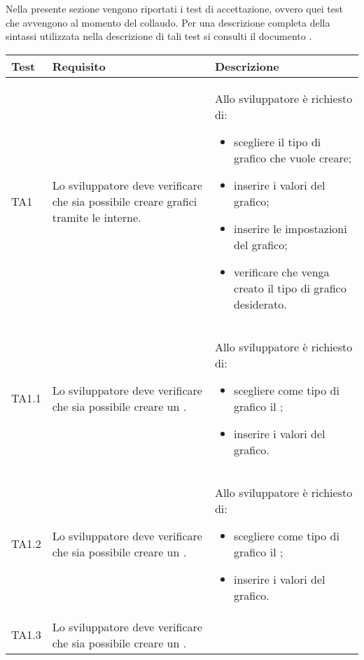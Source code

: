 	Nella presente sezione vengono riportati i test di accettazione, ovvero quei test che avvengono al momento del collaudo. Per una descrizione completa della sintassi utilizzata nella descrizione di tali test si consulti il documento .

	\begin{longtabu}{| X[0.5] | X | X |}

	\hline
	\rowfont{\bf}
	Test &
	Requisito &
	Descrizione \\
	\hline \endhead

	TA1 & Lo sviluppatore deve verificare che sia possibile creare grafici tramite le  interne.
	 
		& Allo sviluppatore è richiesto di:
		\begin{itemize}
			\item scegliere il tipo di grafico che vuole creare;
			\item inserire i valori del grafico;
			\item inserire le impostazioni del grafico;
			\item verificare che venga creato il tipo di grafico desiderato.
		\end{itemize}
\\ \hline

	TA1.1 & Lo sviluppatore deve verificare che sia possibile creare un .

		& Allo sviluppatore è richiesto di:
		\begin{itemize}
			\item scegliere come tipo di grafico il ;
			\item inserire i valori del grafico.
		\end{itemize}
\\ \hline

	TA1.2 & Lo sviluppatore deve verificare che sia possibile creare un .

		& Allo sviluppatore è richiesto di:
		\begin{itemize}
			\item scegliere come tipo di grafico il ;
			\item inserire i valori del grafico.
		\end{itemize}
\\ \hline

	TA1.3 & Lo sviluppatore deve verificare che sia possibile creare un .


\end{longtabu}
